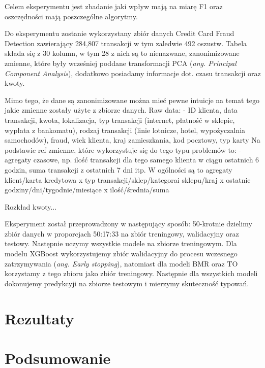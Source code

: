 \documentclass{book}
\begin{document}
Celem eksperymentu jest zbadanie jaki wpływ mają na miarę F1 oraz oszczędności mają poszczególne algorytmy.

Do eksperymentu zostanie wykorzystany zbiór danych Credit Card Fraud Detection zawierający 284,807 transakcji w tym zaledwie 492 oszustw. Tabela składa się z 30 kolumn, w tym 28 z nich są to nienazwane, zanonimizowane zmienne, które były wcześniej poddane transformacji PCA (\textit{ang. Principal Component Analysis}), dodatkowo posiadamy informacje dot. czasu transakcji oraz kwoty. 

Mimo tego, że dane są zanonimizowane można mieć pewne intuicje na temat tego jakie zmienne zostały użyte z zbiorze danych. 
Raw data:
- ID klienta, data transakcji, kwota, lokalizacja, typ transakcji (internet, płatność w sklepie, wypłata z bankomatu), rodzaj transakcji (linie lotnicze, hotel, wypożyczalnia samochodów), fraud, wiek klienta, kraj zamieszkania, kod pocztowy, typ karty
Na podstawie ref zmienne, które wykorzystuje się do tego typu problemów to:
- agregaty czasowe, np. ilość transakcji dla tego samego klienta w ciągu ostatnich 6 godzin, suma transakcji z ostatnich 7 dni itp.
W ogólności są to agregaty klient/karta kredytowa x typ transakcji/sklep/kategorai sklepu/kraj x ostatnie godziny/dni/tygodnie/miesiące x ilość/średnia/suma


Rozkład kwoty...

Eksperyment został przeprowadzony w następujący sposób:
50-krotnie dzielimy zbiór danych w proporcjach 50:17:33 na zbiór treningowy, walidacyjny oraz testowy. Następnie uczymy wszystkie modele na zbiorze treningowym. Dla modelu XGBoost wykorzystujemy zbiór walidacyjny do procesu wczesnego zatrzymywania (\textit{ang. Early stopping}), natomiast dla modeli BMR oraz TO korzystamy z tego zbioru jako zbiór treningowy. Następnie dla wszystkich modeli dokonujemy predykcyji na zbiorze testowym i mierzymy skuteczność typowań.

\chapter{Rezultaty}

\chapter{Podsumowanie}


\end{document}
